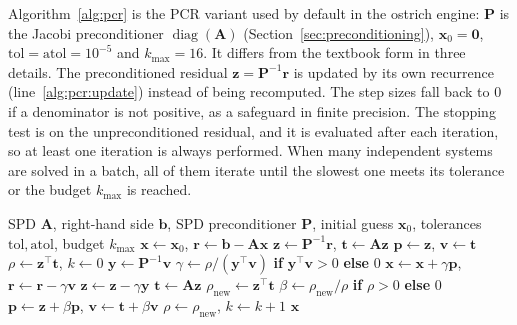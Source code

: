 Algorithm~\ref{alg:pcr} is the PCR variant used by default in the ostrich
engine: $\mathbf{P}$ is the Jacobi preconditioner $\operatorname{diag}(\mathbf{A})$
(Section~\ref{sec:preconditioning}), $\mathbf{x}_0 = \mathbf{0}$,
$\mathrm{tol} = \mathrm{atol} = 10^{-5}$ and $k_{\max} = 16$. It differs
from the textbook form in three details. The preconditioned
residual $\mathbf{z} = \mathbf{P}^{-1}\mathbf{r}$ is updated by its own recurrence
(line~\ref{alg:pcr:update}) instead of being recomputed. The step sizes fall
back to $0$ if a denominator is not positive, as a safeguard in finite
precision. The stopping test is on the unpreconditioned residual, and it is
evaluated after each iteration, so at least one iteration is always performed. When many independent systems are solved in a batch, all of them
iterate until the slowest one meets its tolerance or the budget $k_{\max}$
is reached.

\begin{algorithm}[h]
  \caption{Preconditioned conjugate residual (PCR), as used in ostrich}
  \label{alg:pcr}
  \begin{algorithmic}[1]
    \Require SPD $\mathbf{A}$, right-hand side $\mathbf{b}$, SPD preconditioner $\mathbf{P}$, initial guess $\mathbf{x}_0$, tolerances $\mathrm{tol}, \mathrm{atol}$, budget $k_{\max}$
    \State $\mathbf{x} \gets \mathbf{x}_0$, \quad $\mathbf{r} \gets \mathbf{b} - \mathbf{A}\mathbf{x}$
    \State $\mathbf{z} \gets \mathbf{P}^{-1}\mathbf{r}$, \quad $\mathbf{t} \gets \mathbf{A}\mathbf{z}$
    \State $\mathbf{p} \gets \mathbf{z}$, \quad $\mathbf{v} \gets \mathbf{t}$ 
    \State $\rho \gets \mathbf{z}^\top \mathbf{t}$, \quad $k \gets 0$
    \Repeat
      \State $\mathbf{y} \gets \mathbf{P}^{-1}\mathbf{v}$
      \State $\gamma \gets \rho / (\mathbf{y}^\top \mathbf{v})$ \textbf{if} $\mathbf{y}^\top \mathbf{v} > 0$ \textbf{else} $0$
      \State $\mathbf{x} \gets \mathbf{x} + \gamma \mathbf{p}$, \quad $\mathbf{r} \gets \mathbf{r} - \gamma \mathbf{v}$
      \State $\mathbf{z} \gets \mathbf{z} - \gamma \mathbf{y}$  \label{alg:pcr:update}
      \State $\mathbf{t} \gets \mathbf{A}\mathbf{z}$
      \State $\rho_{\text{new}} \gets \mathbf{z}^\top \mathbf{t}$
      \State $\beta \gets \rho_{\text{new}} / \rho$ \textbf{if} $\rho > 0$ \textbf{else} $0$
      \State $\mathbf{p} \gets \mathbf{z} + \beta \mathbf{p}$, \quad $\mathbf{v} \gets \mathbf{t} + \beta \mathbf{v}$
      \State $\rho \gets \rho_{\text{new}}$, \quad $k \gets k + 1$
    \State \Return $\mathbf{x}$
  \end{algorithmic}
\end{algorithm}
